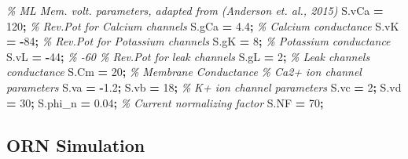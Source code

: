 \documentclass[
]{article}
\newenvironment{Shaded}{\begin{snugshade}}{\end{snugshade}}
\newcommand{\CommentTok}[1]{\textcolor[rgb]{0.56,0.35,0.01}{\textit{#1}}}
\newcommand{\FloatTok}[1]{\textcolor[rgb]{0.00,0.00,0.81}{#1}}
\newcommand{\NormalTok}[1]{#1}
\newcommand{\OperatorTok}[1]{\textcolor[rgb]{0.81,0.36,0.00}{\textbf{#1}}}
\begin{document}
\begin{Shaded}
\begin{Highlighting}[]
\CommentTok{\% ML Mem. volt. parameters, adapted from (Anderson et. al., 2015)}
\NormalTok{S.vCa }\OperatorTok{=} \FloatTok{120}\OperatorTok{;}                \CommentTok{\% Rev.Pot for Calcium channels}
\NormalTok{S.gCa }\OperatorTok{=} \FloatTok{4.4}\OperatorTok{;}                \CommentTok{\% Calcium conductance}
\NormalTok{S.vK  }\OperatorTok{=} \OperatorTok{{-}}\FloatTok{84}\OperatorTok{;}                \CommentTok{\% Rev.Pot for Potassium channels}
\NormalTok{S.gK  }\OperatorTok{=}   \FloatTok{8}\OperatorTok{;}                \CommentTok{\% Potassium conductance}
\NormalTok{S.vL  }\OperatorTok{=} \OperatorTok{{-}}\FloatTok{44}\OperatorTok{;} \CommentTok{\% {-}60          \% Rev.Pot for leak channels}
\NormalTok{S.gL  }\OperatorTok{=}   \FloatTok{2}\OperatorTok{;}                \CommentTok{\% Leak channels conductance}
\NormalTok{S.Cm  }\OperatorTok{=}  \FloatTok{20}\OperatorTok{;}                \CommentTok{\% Membrane Conductance}
\CommentTok{\% Ca2+ ion channel parameters}
\NormalTok{S.va }\OperatorTok{=} \OperatorTok{{-}}\FloatTok{1.2}\OperatorTok{;}\NormalTok{ S.vb }\OperatorTok{=} \FloatTok{18}\OperatorTok{;}
\CommentTok{\% K+ ion channel parameters}
\NormalTok{S.vc }\OperatorTok{=} \FloatTok{2}\OperatorTok{;}\NormalTok{ S.vd }\OperatorTok{=} \FloatTok{30}\OperatorTok{;}\NormalTok{ S.phi\_n }\OperatorTok{=} \FloatTok{0.04}\OperatorTok{;}
\CommentTok{\% Current normalizing factor}
\NormalTok{S.NF }\OperatorTok{=} \FloatTok{70}\OperatorTok{;}
\end{Highlighting}
\end{Shaded}

\hypertarget{orn-simulation}{%
\subsection*{ORN Simulation}\label{orn-simulation}}
\end{document}
